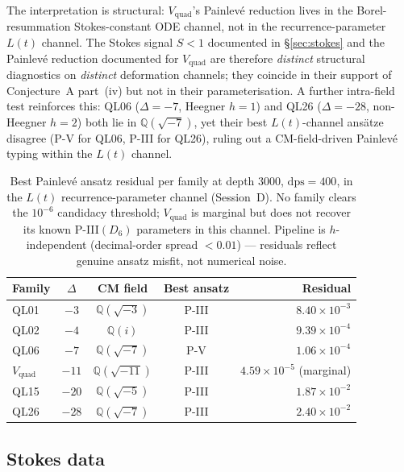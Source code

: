 \documentclass[11pt,reqno]{amsart}
\theoremstyle{definition}
\begin{document}
The interpretation is structural: $V_{\mathrm{quad}}$'s
Painlev\'e reduction lives in the Borel-resummation
Stokes-constant ODE channel, not in the recurrence-parameter
$L(t)$ channel. The Stokes signal $S<1$ documented in
\S\ref{sec:stokes} and the Painlev\'e reduction documented for
$V_{\mathrm{quad}}$ are therefore \emph{distinct} structural
diagnostics on \emph{distinct} deformation channels; they
coincide in their support of Conjecture~A part~(iv) but not in
their parameterisation. A further intra-field test reinforces
this: QL06 ($\Delta=-7$, Heegner $h=1$) and QL26
($\Delta=-28$, non-Heegner $h=2$) both lie in
$\mathbb{Q}(\sqrt{-7})$, yet their best $L(t)$-channel
ans\"atze disagree (P-V for QL06, P-III for QL26), ruling
out a CM-field-driven Painlev\'e typing within the $L(t)$
channel.

\begin{table}[ht]
\centering
\begin{tabular}{lcccr}
\toprule
Family & $\Delta$ & CM field & Best ansatz & Residual \\
\midrule
QL01    & $-3$  & $\mathbb{Q}(\sqrt{-3})$  & P-III & $8.40\times 10^{-3}$ \\
QL02    & $-4$  & $\mathbb{Q}(i)$           & P-III & $9.39\times 10^{-4}$ \\
QL06    & $-7$  & $\mathbb{Q}(\sqrt{-7})$  & P-V   & $1.06\times 10^{-4}$ \\
$V_{\mathrm{quad}}$ & $-11$ & $\mathbb{Q}(\sqrt{-11})$ & P-III & $4.59\times 10^{-5}$ (marginal) \\
QL15    & $-20$ & $\mathbb{Q}(\sqrt{-5})$  & P-III & $1.87\times 10^{-2}$ \\
QL26    & $-28$ & $\mathbb{Q}(\sqrt{-7})$  & P-III & $2.40\times 10^{-2}$ \\
\bottomrule
\end{tabular}
\caption{Best Painlev\'e ansatz residual per family at depth
$3000$, $\mathrm{dps}=400$, in the $L(t)$ recurrence-parameter
channel (Session~D). No family clears the $10^{-6}$ candidacy
threshold; $V_{\mathrm{quad}}$ is marginal but does not recover
its known P-III$(D_{6})$ parameters in this channel. Pipeline
is $h$-independent (decimal-order spread $<0.01$) --- residuals
reflect genuine ansatz misfit, not numerical noise.}
\label{tab:painleve-deep}
\end{table}

\subsection{Stokes data}
\end{document}
